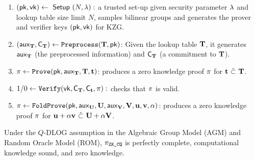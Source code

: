 \begin{enumerate}
	\item $(\mathsf{pk},\mathsf{vk}) \leftarrow {~\mathsf{Setup}~}(N, \lambda): $ a trusted set-up
	given security parameter $\lambda$ and lookup table size
	limit $N$, samples bilinear groups and generates the
	prover and verifier keys $(\mathsf{pk}, \mathsf{vk})$ for KZG.

	\item $(\mathsf{aux}_{{{\mathbf {T}}}},{\mathsf{C}}_{{{\mathbf {T}}}}) 
		\leftarrow \texttt{Preprocess}({{\mathbf {T}}}, \mathsf{pk})$: Given the lookup 
	table ${{\mathbf {T}}}$, it generates 
	$\mathsf{aux}_{{{\mathbf {T}}}}$ (the preprocessed information)
	and ${\mathsf{C}}_{{{\mathbf {T}}}}$ (a commitment to ${{\mathbf {T}}}$).

	\item $\pi 
	\leftarrow \texttt{Prove}(\mathsf{pk}, \mathsf{aux}_{{{\mathbf {T}}}}, {{\mathbf {T}}}, {{\mathbf {t}}})$: produces
	a zero knowledge proof $\pi$ for
	${{\mathbf {t}}} ~\hat{\subset}~ {{\mathbf {T}}}$.

	\item $1/0 \leftarrow \texttt{Verify}(\mathsf{vk}, {\mathsf{C}}_{{{\mathbf {T}}}}, 
	{\mathsf{C}}_{{{\mathbf {t}}}}, \pi):$ checks that $\pi$ is valid.

	\item $\pi 
	\leftarrow {\texttt{FoldProve}}(\mathsf{pk}, \mathsf{aux}_{{{\mathbf {U}}}}, {{\mathbf {U}}}, 
		\mathsf{aux}_{{{\mathbf {V}}}}, {{\mathbf {V}}}, 
		{{\mathbf {u}}}, {{\mathbf {v}}}, \alpha)$: produces
	a zero knowledge proof $\pi$ for
	${{\mathbf {u}}} + \alpha {{\mathbf {v}}} ~\hat{\subset}~ 
		{{\mathbf {U}}} + \alpha {{\mathbf {V}}}$.

\end{enumerate}


\begin{theorem} Under the $Q$-DLOG assumption \cite{cq} in
the Algebraic Group Model (AGM) and Random Oracle Model (ROM),
$\pi_\texttt{ZK\_CQ}$ is perfectly complete, computational
knowledge sound, and zero knowledge.
\end{theorem}

